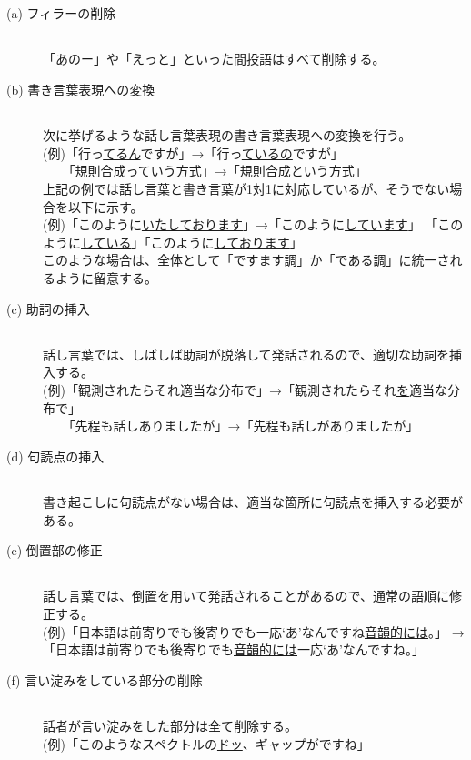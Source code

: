\begin{description}
\item [(a) フィラーの削除 ] \verb+ +\\ 「あのー」や「えっと」といった間投語はすべて削除する。

\item [(b) 書き言葉表現への変換] \verb+ +\\ 次に挙げるような話し言葉表現の書き言葉表現への変換を行う。\\
(例)「行っ\underline{てるん}ですが」→「行っ\underline{ているの}ですが」\\
\verb+   +「規則合成\underline{っていう}方式」→「規則合成\underline{という}方式」\\
上記の例では話し言葉と書き言葉が1対1に対応しているが、そうでない場合を以下に示す。\\
(例)「このように\underline{いたして}\underline{おります}」→「このように\underline{して}\underline{います}」
「このように\underline{して}\underline{いる}」「このように\underline{して}\underline{おります}」\\
このような場合は、全体として「ですます調」か「である調」に統一されるように留意する。

\item [(c) 助詞の挿入] \verb+ +\\ 話し言葉では、しばしば助詞が脱落して発話されるので、適切な助詞を挿入する。\\
(例)「観測されたらそれ適当な分布で」→「観測されたらそれ\underline{を}適当な分布で」\\
\verb+   +「先程も話しありましたが」→「先程も話しがありましたが」

\item [(d) 句読点の挿入] \verb+ +\\ 書き起こしに句読点がない場合は、適当な箇所に句読点を挿入する必要がある。
 
\item [(e) 倒置部の修正] \verb+ +\\ 話し言葉では、倒置を用いて発話されることがあるので、通常の語順に修正する。\\
(例)「日本語は前寄りでも後寄りでも一応‘あ’なんですね\underline{音韻的には}。」                        
→「日本語は前寄りでも後寄りでも\underline{音韻的には}一応‘あ’なんですね。」

\item [(f) 言い淀みをしている部分の削除] \verb+ +\\ 話者が言い淀みをした部分は全て削除する。\\
(例)「このようなスペクトルの\underline{ドッ}、ギャップがですね」


\end{description}
